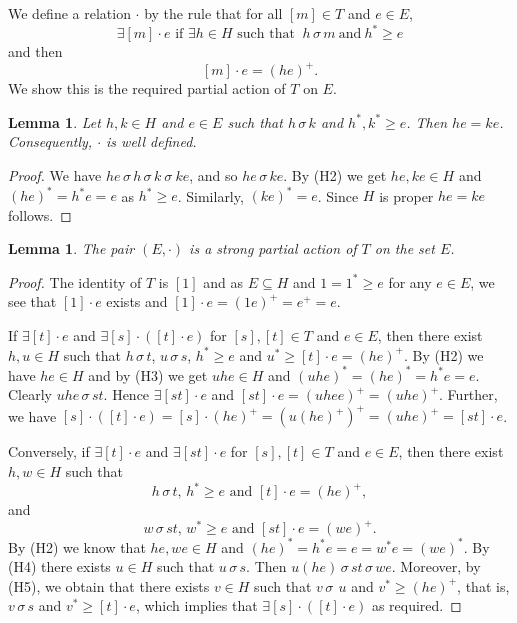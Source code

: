 \documentclass[12pt]{amsart}
\newtheorem{lem}[them]{Lemma}
\theoremstyle{definition}
\theoremstyle{definition}
\numberwithin{them}{section}
\numberwithin{equation}{section}
\begin{document}
{{We define a relation $\cdot$  by the rule that for all $[m] \in T$ and $e \in E$,
\[ \exists [m] \cdot e  \mbox{ if } \exists h \in H\mbox{ such that }\ h\, \sigma\, m\ \mbox{and}\ h^\ast \geq e\]
and then
\[[m] \cdot e=(he)^+.\]
We show this is the required partial  action of $T$  on $E$. 

\begin{lem}\label{me+=ue+}
Let  $h, k \in H$ and $e \in E$  such  that $h\, \sigma\, k$ and $h^\ast, k^\ast \geq e$.  Then $he = ke$. Consequently, $\cdot$ is well defined. 
\end{lem}
\begin{proof}  We have  $he \, \sigma\, h\, \sigma\, k \ \sigma\ ke$, and so $he\, \sigma\, ke$. By (H2) we get $he, ke \in H$ and  $(he)^{\ast}  = h^\ast e = e$ as $h^\ast \geq e$. Similarly, $(ke)^{\ast} = e$. Since $H$ is proper $he = ke$ follows.
\end{proof}


\begin{lem}\label{stronglypartialaction2} The pair $(E,\cdot)$  is a strong partial action of  $T$  on the set $E$.
\end{lem}
\begin{proof} The identity of $T$ is $[1]$ and as $E\subseteq H$ and $1=1^*\geq e$ for any $e\in E$, we see that  $[1]\cdot e$ exists and $[1]\cdot e=(1e)^+=e^+=e$. 

If $\exists [t] \cdot e$ and $\exists [s] \cdot ([t] \cdot e)$ for $[s], [t] \in T$ and $e \in E$, then there exist $h, u \in H$ such that $h \, \sigma\, t$, $u\, \sigma\, s$, $h^\ast \geq e$ and $u^\ast \geq [t] \cdot e = (he)^+$. By (H2) we have $he \in H$ and by (H3) we get $uhe \in H$ and  $(uhe)^\ast = (he)^\ast = h^\ast e = e$. Clearly $uhe\, \sigma\, st$. Hence $\exists [st] \cdot e$  and $[st]\cdot e=(uhee)^+=(uhe)^+$.  Further, we have  $[s] \cdot ([t] \cdot e) = [s] \cdot (he)^+ = (u(he)^+)^+ = (uhe)^+ = [st] \cdot e$.

Conversely, if $\exists [t] \cdot e$ and $\exists [st] \cdot e$ for $[s], [t] \in T$ and $e \in E$, then there exist $h, w \in H$ such that
 \[h \, \sigma\, t,\,  h^\ast \geq e\mbox{ and } [t] \cdot e = (he)^+,\]
 and 
 \[w\, \sigma\, st,\,  w^\ast \geq  e\mbox{ and } [st]\cdot e = (we)^+.\]
 By (H2) we know that $he,we\in H$ and $(he)^{\ast} = h^{\ast}e = e = w^{\ast}e = (we)^{\ast}$.  By (H4) there exists $u \in H$ such that $u\, \sigma\, s$.  Then $u(he)\, \sigma\, st\, \sigma\, we $. Moreover, by (H5),   we obtain that there exists $v \in H$ such that $v \, \sigma\,\ u$ and $v^{\ast} \geq (he)^+$, that is, $v \, \sigma\, s$ and $v^{\ast} \geq [t]\cdot e$, which implies that $\exists [s] \cdot ([t] \cdot e)$ as required.
\end{proof}

}}
\end{document}
